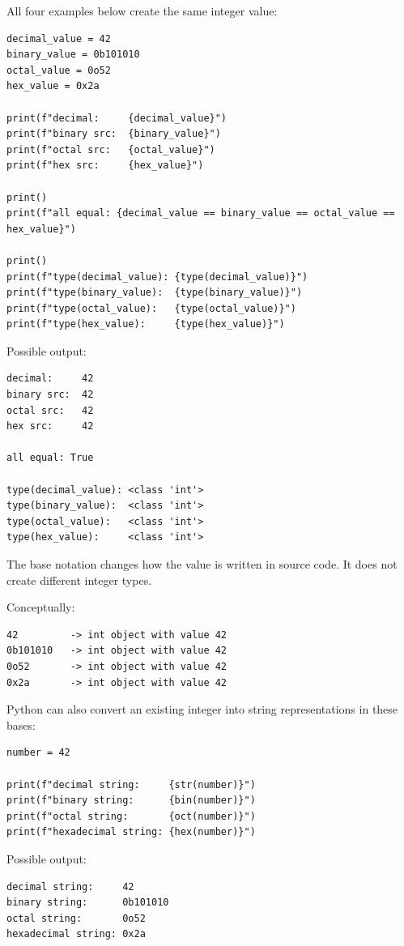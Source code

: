All four examples below create the same integer value:

\begin{verbatim}
decimal_value = 42
binary_value = 0b101010
octal_value = 0o52
hex_value = 0x2a

print(f"decimal:     {decimal_value}")
print(f"binary src:  {binary_value}")
print(f"octal src:   {octal_value}")
print(f"hex src:     {hex_value}")

print()
print(f"all equal: {decimal_value == binary_value == octal_value == hex_value}")

print()
print(f"type(decimal_value): {type(decimal_value)}")
print(f"type(binary_value):  {type(binary_value)}")
print(f"type(octal_value):   {type(octal_value)}")
print(f"type(hex_value):     {type(hex_value)}")
\end{verbatim}

Possible output:

\begin{verbatim}
decimal:     42
binary src:  42
octal src:   42
hex src:     42

all equal: True

type(decimal_value): <class 'int'>
type(binary_value):  <class 'int'>
type(octal_value):   <class 'int'>
type(hex_value):     <class 'int'>
\end{verbatim}

The base notation changes how the value is written in source code. It does not create different integer types.

Conceptually:

\begin{verbatim}
42         -> int object with value 42
0b101010   -> int object with value 42
0o52       -> int object with value 42
0x2a       -> int object with value 42
\end{verbatim}

Python can also convert an existing integer into string representations in these bases:

\begin{verbatim}
number = 42

print(f"decimal string:     {str(number)}")
print(f"binary string:      {bin(number)}")
print(f"octal string:       {oct(number)}")
print(f"hexadecimal string: {hex(number)}")
\end{verbatim}

Possible output:

\begin{verbatim}
decimal string:     42
binary string:      0b101010
octal string:       0o52
hexadecimal string: 0x2a
\end{verbatim}

